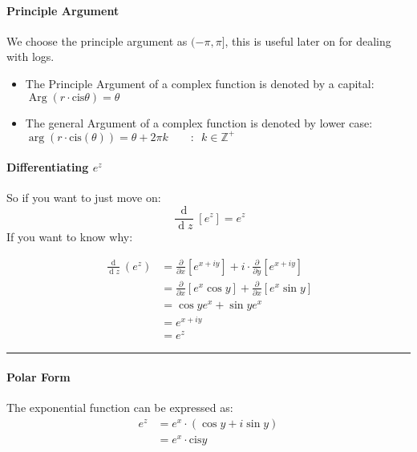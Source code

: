 \documentclass[class=article, crop=false]{standalone}
\begin{document}
    \paragraph{Principle Argument}
    We choose the principle argument as $(-\pi, \pi]$, this is useful later on for dealing with logs.
    \begin{itemize}
      \item The Principle Argument of a complex function is denoted by a capital:
        \subitem $\operatorname{Arg}\left( r \cdot \mathrm{cis}{\theta} \right) = \theta$
      \item The general Argument of a complex function is denoted by lower case:
        \subitem $\operatorname{arg}\left( r\cdot \mathrm{cis}{\left( \theta \right) } \right) = \theta +  2\pi k \qquad :\enspace k \in \mathbb{Z}^+$
    \end{itemize}

    \paragraph{Differentiating $e^z$}
    So if you want to just move on:
    \[
    \frac{\operatorname{d} }{\operatorname{d} z}\left[ e^z \right] = e^z
    \]
    If you want to know why:

    \begin{align*}
      \frac{\operatorname{d} }{\operatorname{d} z}\left( e^z \right) &= \frac{\partial }{\partial x} \left[ e^{x +  iy} \right] +  i \cdot \frac{\partial }{\partial y}\left[ e^{x + iy} \right] \\
      &= \frac{\partial }{\partial x}\left[ e^x \cos{y} \right] + \frac{\partial }{\partial x}\left[ e^x \sin{y} \right] \\
      &= \cos{y}e^x +  \sin{y}e^x\\
      &= e^{x + iy}\\
      &= e^z
    \end{align*}
    \begin{flushright}
    {\rule{0.7em}{0.7em}}
    \end{flushright}

    \paragraph{Polar Form}
    The exponential function can be expressed as:
    \begin{align*}
    e^z &= e^x \cdot \left( \cos{y} +  i \sin{y} \right) \\
    &= e^x\cdot \mathrm{cis}{y}
    \end{align*}
\end{document}
